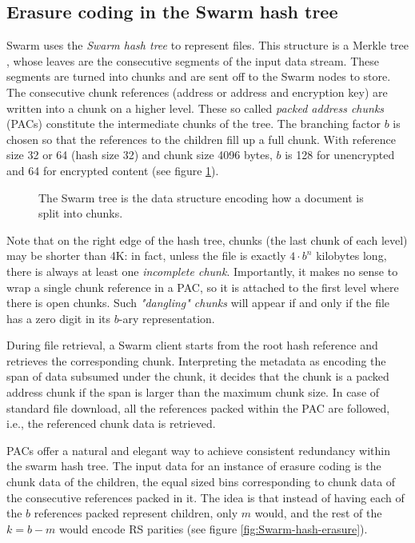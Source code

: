 \subsection{Erasure coding in the Swarm hash tree \statusgreen}
\label{sec:erasure-bmt}

Swarm uses the \emph{Swarm hash tree} to represent files. This structure is a Merkle tree \cite{merkle1980protocols}, whose leaves are the consecutive segments of the input data stream. These segments are turned into chunks and are sent off to the Swarm nodes to store. The consecutive chunk references (address or address and encryption key) are written into a chunk on a higher level.
These so called \emph{packed address chunks} (PACs) constitute the intermediate chunks of the tree.
The branching factor $b$ is chosen so that the references to the children fill up a full chunk.
With reference size 32 or 64 (hash size 32) and chunk size 4096 bytes, $b$ is 128 for unencrypted and 64 for encrypted content 
(see figure \ref{fig:Swarm-hash-split}).


\begin{figure}[!ht]
   \centering
   
   \caption[Swarm hash split \statusgreen]{The Swarm tree is the data structure encoding how a document is split into chunks.}
   \label{fig:Swarm-hash-split}
\end{figure}

Note that on the right edge of the hash tree, chunks (the last chunk of each level) may be shorter than 4K: in fact, unless the file is exactly $4\cdot b^n$ kilobytes long, there is always at least one \emph{incomplete chunk}.  Importantly, it makes no sense to wrap a single chunk reference in a PAC, so it is attached to the first level where there is open chunks. Such \emph{"dangling" chunks} will appear if and only if the file has a zero digit in its $b$-ary representation. 

During file retrieval, a Swarm client starts from the root hash reference and retrieves the corresponding chunk. Interpreting the metadata as encoding the span of data subsumed under the chunk, it decides that the chunk is a packed address chunk if the span is larger than the maximum chunk size. 
In case of standard file download, all the references packed within the PAC are followed, i.e., the referenced chunk data is retrieved. 

PACs offer a natural and elegant way to achieve consistent redundancy within the swarm hash tree.
The input data for an instance of erasure coding is the chunk data of the children, the equal sized bins corresponding to chunk data of the consecutive references packed in it. The idea is that instead of having each of the $b$ references packed represent children, only $m$ would, and the rest of the $k=b-m$ would encode RS parities (see figure \ref{fig:Swarm-hash-erasure}).


